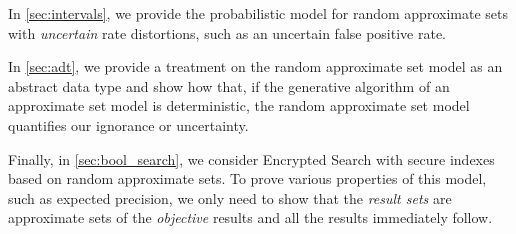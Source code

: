 \documentclass[ ../main.tex]{subfiles}
\begin{document}
In \cref{sec:intervals}, we provide the probabilistic model for random approximate sets with \emph{uncertain} rate distortions, such as an uncertain false positive rate.

In \cref{sec:adt}, we provide a treatment on the random approximate set model as an abstract data type and show how that, if the generative algorithm of an approximate set model is deterministic, the random approximate set model quantifies our ignorance or uncertainty.

Finally, in \cref{sec:bool_search}, we consider Encrypted Search with secure indexes based on random approximate sets.
To prove various properties of this model, such as expected precision, we only need to show that the \emph{result sets} are approximate sets of the \emph{objective} results and all the results immediately follow.
\end{document}
